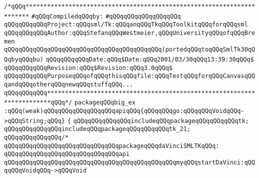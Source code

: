 \label{src/lib/tk/src/tests+examples/big_ex.pkg}
\verb|/*qQQq***********************************************************************|\newline
\newline
\verb|#qQQqCompiledqQQqby:|\newline
\verb|#qQQqqQQqqQQqqQQqqQQq|\newline
\newline
\verb|qQQqqQQqqQQqProject:qQQqsml/Tk:qQQqanqQQqTkqQQqToolkitqQQqforqQQqsml|\newline
\verb|qQQqqQQqqQQqAuthor:qQQqStefanqQQqWestmeier,qQQqUniversityqQQqofqQQqBremen|\newline
\verb|qQQqqQQqqQQqqQQqqQQqqQQqqQQqqQQqqQQqqQQqqQQq(portedqQQqtoqQQqSmlTk30qQQqbyqQQqbu)|\newline
\verb|qQQqqQQqqQQqDate:qQQq$Date:qQQq2001/03/30qQQq13:39:30qQQq$|\newline
\verb|qQQqqQQqqQQqRevision:qQQq$Revision:qQQq3.0qQQq$|\newline
\verb|qQQqqQQqqQQqPurposeqQQqofqQQqthisqQQqfile:qQQqTestqQQqforqQQqCanvasqQQqandqQQqotherqQQqnewqQQqstuffqQQq...|\newline
\newline
\verb|qQQqqQQqqQQq***********************************************************************qQQq*/|\newline
\newline
\verb|packageqQQqbig_ex|\newline
\newline
\verb|:qQQq(weak)qQQqqQQqqQQqqQQqqQQqapiqQQq{qQQqqQQqgo:qQQqqQQqVoidqQQq->qQQqString;qQQq}|\newline
\newline
\verb|{|\newline
\newline
\verb|qQQqqQQqqQQqqQQqincludeqQQqpackageqQQqqQQqqQQqtk;|\newline
\verb|qQQqqQQqqQQqqQQqincludeqQQqpackageqQQqqQQqqQQqtk_21;|\newline
\newline
\verb|qQQqqQQqqQQqqQQq/*|\newline
\verb|qQQqqQQqqQQqqQQqqQQqqQQqqQQqqQQqpackageqQQqdaVinciSMLTKqQQq:|\newline
\verb|qQQqqQQqqQQqqQQqqQQqqQQqqQQqqQQqapi|\newline
\verb|qQQqqQQqqQQqqQQqqQQqqQQqqQQqqQQqqQQqqQQqqQQqqQQqmyqQQqstartDaVinci:qQQqqQQqVoidqQQq->qQQqVoid|\newline
